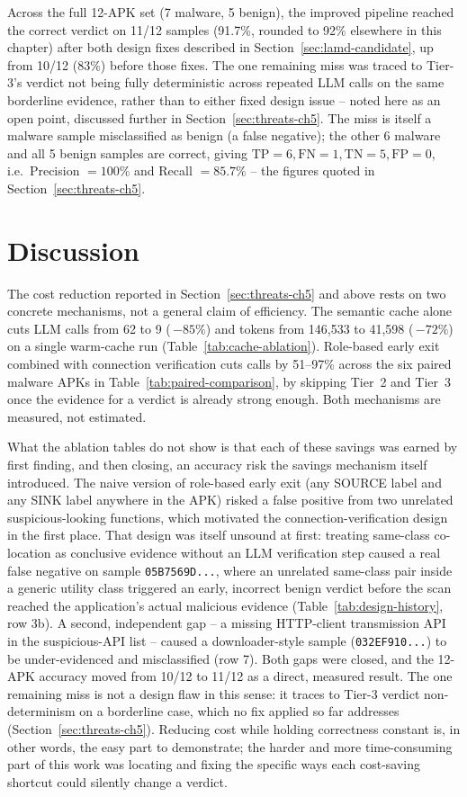 Across the full 12-APK set (7 malware, 5 benign), the improved pipeline
reached the correct verdict on 11/12 samples (91.7\%, rounded to 92\%
elsewhere in this chapter) after both design fixes described in
Section~\ref{sec:lamd-candidate}, up from 10/12 (83\%) before those fixes.
The one remaining miss was traced to Tier-3's verdict not being fully
deterministic across repeated LLM calls on the same borderline evidence,
rather than to either fixed design issue -- noted here as an open point,
discussed further in Section~\ref{sec:threats-ch5}. The miss is itself a
malware sample misclassified as benign (a false negative); the other 6
malware and all 5 benign samples are correct, giving
$\mathrm{TP}=6,\mathrm{FN}=1,\mathrm{TN}=5,\mathrm{FP}=0$, i.e.\ Precision
$=100\%$ and Recall $=85.7\%$ -- the figures quoted in
Section~\ref{sec:threats-ch5}.

\section{Discussion}

The cost reduction reported in Section~\ref{sec:threats-ch5} and above rests
on two concrete mechanisms, not a general claim of efficiency. The semantic
cache alone cuts LLM calls from 62 to 9 (\,$-85\%$) and tokens from 146,533
to 41,598 (\,$-72\%$) on a single warm-cache run (Table~\ref{tab:cache-ablation}).
Role-based early exit combined with connection verification cuts calls by
51--97\% across the six paired malware APKs in
Table~\ref{tab:paired-comparison}, by skipping Tier~2 and Tier~3 once the
evidence for a verdict is already strong enough. Both mechanisms are
measured, not estimated.

What the ablation tables do not show is that each of these savings was
earned by first finding, and then closing, an accuracy risk the savings
mechanism itself introduced. The naive version of role-based early exit
(any SOURCE label and any SINK label anywhere in the APK) risked a false
positive from two unrelated suspicious-looking functions, which motivated
the connection-verification design in the first place. That design was
itself unsound at first: treating same-class co-location as conclusive
evidence without an LLM verification step caused a real false negative on
sample \texttt{05B7569D...}, where an unrelated same-class pair inside a
generic utility class triggered an early, incorrect benign verdict before
the scan reached the application's actual malicious evidence
(Table~\ref{tab:design-history}, row 3b). A second, independent gap --
a missing HTTP-client transmission API in the suspicious-API list -- caused
a downloader-style sample (\texttt{032EF910...}) to be under-evidenced and
misclassified (row 7). Both gaps were closed, and the 12-APK accuracy moved
from 10/12 to 11/12 as a direct, measured result. The one remaining miss is
not a design flaw in this sense: it traces to Tier-3 verdict
non-determinism on a borderline case, which no fix applied so far
addresses (Section~\ref{sec:threats-ch5}). Reducing cost while holding
correctness constant is, in other words, the easy part to demonstrate; the
harder and more time-consuming part of this work was locating and fixing
the specific ways each cost-saving shortcut could silently change a
verdict.

